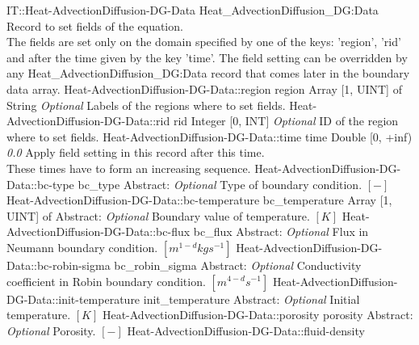 \begin{RecordType}
	{IT::Heat-AdvectionDiffusion-DG-Data}
	{Heat{\_}AdvectionDiffusion{\_}DG:Data}
	{} %
	{} %
	{{{Record to set fields of the equation.}\\{
The fields are set only on the domain specified by one of the keys: 'region', 'rid'}\\{
and after the time given by the key 'time'. The field setting can be overridden by}\\{
 any Heat{\_}AdvectionDiffusion{\_}DG:Data record that comes later in the boundary data array.}}}
		\RecKey
			{Heat-AdvectionDiffusion-DG-Data::region}
			{region}
			{{Array [1, UINT] of }{String}}
			{ \it{Optional} }
			{{{Labels of the regions where to set fields. }}}
		\RecKey
			{Heat-AdvectionDiffusion-DG-Data::rid}
			{rid}
			{{Integer [0, INT]}}
			{ \it{Optional} }
			{{{ID of the region where to set fields.}}}
		\RecKey
			{Heat-AdvectionDiffusion-DG-Data::time}
			{time}
			{{Double [0, +inf)}}
			{ \it{0.0} }
			{{{Apply field setting in this record after this time.}\\{
These times have to form an increasing sequence.}}}
		\RecKey
			{Heat-AdvectionDiffusion-DG-Data::bc-type}
			{bc{\_}type}
			{{Abstract}{: }}
			{ \it{Optional} }
			{{{Type of boundary condition. }{$[-]$}}}
		\RecKey
			{Heat-AdvectionDiffusion-DG-Data::bc-temperature}
			{bc{\_}temperature}
			{{Array [1, UINT] of }{Abstract}{: }}
			{ \it{Optional} }
			{{{Boundary value of temperature. }{$[K]$}}}
		\RecKey
			{Heat-AdvectionDiffusion-DG-Data::bc-flux}
			{bc{\_}flux}
			{{Abstract}{: }}
			{ \it{Optional} }
			{{{Flux in Neumann boundary condition. }{$[m^{1-d}kgs^{-1}]$}}}
		\RecKey
			{Heat-AdvectionDiffusion-DG-Data::bc-robin-sigma}
			{bc{\_}robin{\_}sigma}
			{{Abstract}{: }}
			{ \it{Optional} }
			{{{Conductivity coefficient in Robin boundary condition. }{$[m^{4-d}s^{-1}]$}}}
		\RecKey
			{Heat-AdvectionDiffusion-DG-Data::init-temperature}
			{init{\_}temperature}
			{{Abstract}{: }}
			{ \it{Optional} }
			{{{Initial temperature. }{$[K]$}}}
		\RecKey
			{Heat-AdvectionDiffusion-DG-Data::porosity}
			{porosity}
			{{Abstract}{: }}
			{ \it{Optional} }
			{{{Porosity. }{$[-]$}}}
		\RecKey
			{Heat-AdvectionDiffusion-DG-Data::fluid-density}

\end{RecordType}
